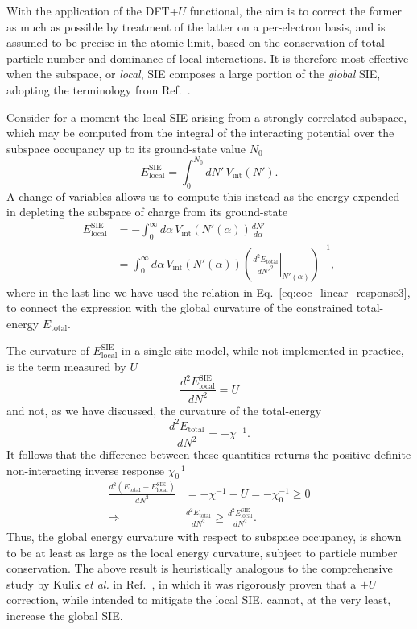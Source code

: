 With the application of the DFT+$U$ functional, 
the aim is to correct the former as much as possible 
by treatment of the latter on a per-electron basis, 
and is assumed to be precise in the atomic limit, 
based on the conservation of total particle number 
and dominance of local interactions. 
%
It is therefore most effective when the 
subspace, or {\it local}, SIE composes    
a large portion of the {\it global} SIE, 
adopting the terminology from 
Ref.~\cite{:/content/aip/journal/jcp/145/5/10.1063/1.4959882}. 

Consider for a moment the local SIE 
arising from a strongly-correlated subspace, 
which may be computed from  
the integral of the interacting potential 
over the subspace occupancy 
up to its ground-state value $N_0$
%
\begin{equation}
E^\textrm{SIE}_\textrm{local}=\int_0^{N_0} dN'\, V_\textrm{int}(N').
\end{equation}
%
A change of variables allows us 
to compute this instead as the 
energy expended in 
depleting the subspace of charge 
from its ground-state
%
\begin{align}
E^\textrm{SIE}_\textrm{local}
&=-\int_0^\infty d\alpha\, V_\textrm{int}(N'(\alpha)) \frac{dN'}{d\alpha}\nonumber\\[0.5em]
&=\int_0^\infty d\alpha\, V_\textrm{int}(N'(\alpha))\left(\left.\frac{d^2E_\textrm{total}}{dN'^2}\right|_{N'(\alpha)}\right)^{-1},
\end{align}
%
where in the last line we have used the relation in 
Eq.~\eqref{eq:coc_linear_response3}, 
to connect the expression with the global 
curvature of the constrained total-energy $E_\textrm{total}$.

The curvature of $E^\textrm{SIE}_\textrm{local}$ 
in a single-site model, 
while not implemented in practice, 
is the term measured by $U$
%
\begin{equation}
\frac{d^2E^\textrm{SIE}_\textrm{local}}{dN^2}=U
\end{equation}
%
and not, as we have discussed, 
the curvature of the total-energy
%
\begin{equation}
\frac{d^2E_\textrm{total}}{dN^2}=-\chi^{-1}.
\end{equation}
%
It follows that the difference between these quantities 
returns the positive-definite non-interacting 
inverse response $\chi_0^{-1}$
%
\begin{align}
\frac{d^2(E_\textrm{total}-E^\textrm{SIE}_\textrm{local})}{dN^2}
&=-\chi^{-1}-U=-\chi_0^{-1} \geq 0\nonumber\\[0.5em]
\Rightarrow\quad&
\frac{d^2E_\textrm{total}}{dN^2}\geq \frac{d^2E^\textrm{SIE}_\textrm{local}}{dN^2}.
\end{align}
%
Thus, the global energy curvature 
with respect to subspace occupancy,
is shown to be at least 
as large as the local energy curvature, 
subject to particle number conservation.
%
The above result is heuristically analogous 
to the comprehensive study by Kulik {\it et al.} in 
Ref.~\cite{:/content/aip/journal/jcp/145/5/10.1063/1.4959882}, 
in which it was rigorously proven that 
a $+U$ correction, 
while intended to mitigate the local SIE, 
cannot, at the very least, increase the global SIE.

